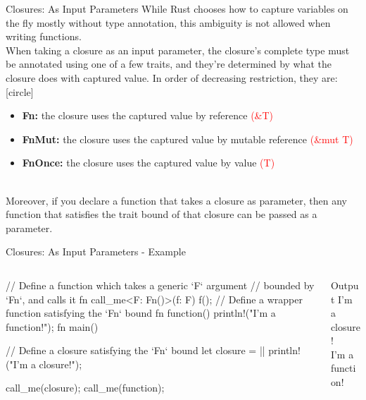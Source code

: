 \documentclass[10pt,xcolor={dvipsnames}, aspectratio=169]{beamer}
\begin{document}
    \begin{frame}{Closures: As Input Parameters}
        While Rust chooses how to capture variables on the fly mostly without type annotation, this ambiguity is not allowed when writing functions. 
        ~\\When taking a closure as an input parameter, the closure's complete type must be annotated using one of a few traits, and they're determined by what the closure does with captured value. 
        In order of decreasing restriction, they are:
        [circle]
        \begin{itemize}
            \item \textbf{Fn:} the closure uses the captured value by reference \textcolor{red}{(\&T)}
            \item \textbf{FnMut:} the closure uses the captured value by mutable reference \textcolor{red}{(\&mut T)}
            \item \textbf{FnOnce:} the closure uses the captured value by value \textcolor{red}{(T)}
        \end{itemize}
        ~\\Moreover, if you declare a function that takes a closure as parameter, then any function that satisfies the trait bound of that closure can be passed as a parameter.
    \end{frame}
    \begin{frame}[fragile]{Closures: As Input Parameters - Example}
        \begin{columns}[T]
			\begin{column}{0.6 \textwidth}
                \begin{rustcode}
// Define a function which takes a generic `F` argument
// bounded by `Fn`, and calls it
fn call_me<F: Fn()>(f: F) {
    f();
}
// Define a wrapper function satisfying the `Fn` bound
fn function() {
    println!("I'm a function!");
}
fn main() {
    // Define a closure satisfying the `Fn` bound
    let closure = || println!("I'm a closure!");

    call_me(closure);
    call_me(function);
}
                \end{rustcode}
			\end{column}
			\begin{column}{0.4 \textwidth}
				\begin{block}{Output}
					I'm a closure!\\
                    I'm a function!
				\end{block}
			\end{column}
		\end{columns}
    \end{frame}
\end{document}
